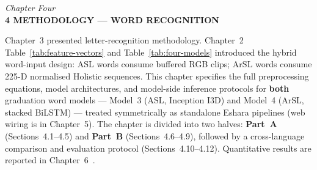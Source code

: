\newpage
\thispagestyle{plain}

\begin{center}
    \vspace*{0.5cm}
    {\large \textit{Chapter Four}} \\[0.4cm]
    {\Large \textbf{4 \quad METHODOLOGY --- WORD RECOGNITION}}
\end{center}
\vspace{1in}

\normalsize
{}

\noindent Chapter~3 presented letter-recognition methodology. Chapter~2 Table~\ref{tab:feature-vectors} and Table~\ref{tab:four-models} introduced the hybrid word-input design: ASL words consume buffered RGB clips; ArSL words consume 225-D normalised Holistic sequences. This chapter specifies the full preprocessing equations, model architectures, and model-side inference protocols for \textbf{both} graduation word models --- Model~3 (ASL, Inception I3D) and Model~4 (ArSL, stacked BiLSTM) --- treated symmetrically as standalone Eshara pipelines (web wiring is in Chapter~5). The chapter is divided into two halves: \textbf{Part~A} (Sections~4.1--4.5) and \textbf{Part~B} (Sections~4.6--4.9), followed by a cross-language comparison and evaluation protocol (Sections~4.10--4.12). Quantitative results are reported in Chapter~6~\cite{li2020wlasl,sidig2021karsl,zhang2020mediapipe}.\par\vspace{0.4cm}


